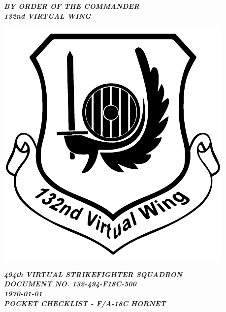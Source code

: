 \begin{titlepage}
	\begin{center}

        \begin{flushleft}
          \small
          \textbf{\textit{BY ORDER OF THE COMMANDER\\132nd VIRTUAL WING\\}}
        \end{flushleft}

        \begin{flushleft}
        	\includegraphics[scale=0.4]{./132nd.pdf}
        \end{flushleft}
        
        \vspace*{-5.6cm}
        
        \begin{flushright}
          \small
          \textbf{\textit{494th VIRTUAL STRIKEFIGHTER SQUADRON}}\\
          \textbf{\textit{DOCUMENT NO. 132-494-F18C-500}}\\
          \vspace*{2.6cm}
          \textbf{\textit{\today}}\\
          \textbf{\textit{POCKET CHECKLIST - F/A-18C HORNET}}\\
        \end{flushright}
        

\end{center}
\end{titlepage}
